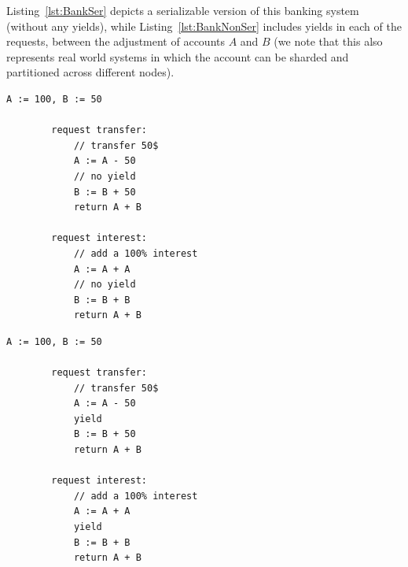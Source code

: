 Listing~\ref{lst:BankSer} depicts a serializable version of this banking system (without any yields), while Listing~\ref{lst:BankNonSer} includes yields in each of the requests, between the adjustment of accounts $A$ and $B$ (we note that this also represents real world systems in which the account can be sharded and partitioned across different nodes).
%


\noindent
\begin{minipage}[H]{0.45\textwidth}
	\begin{lstlisting}[caption={Serializable},
		label={lst:BankSer}]
	    A := 100, B := 50
	    
	    request transfer: 
	        // transfer 50$
	        A := A - 50
	        // no yield
	        B := B + 50
	        return A + B
				
	    request interest: 
	        // add a 100% interest
	        A := A + A
	        // no yield
	        B := B + B
	        return A + B      
			\end{lstlisting}
\end{minipage}
\hfill
\begin{minipage}[H]{0.45\textwidth}
	\begin{lstlisting}[caption={Not serializable},
		label={lst:BankNonSer}]
	    A := 100, B := 50
			
	    request transfer: 
	        // transfer 50$
	        A := A - 50
	        yield
	        B := B + 50
	        return A + B
	
	    request interest: 
	        // add a 100% interest
	        A := A + A
	        yield
	        B := B + B
	        return A + B
      		\end{lstlisting}
\end{minipage}
	

